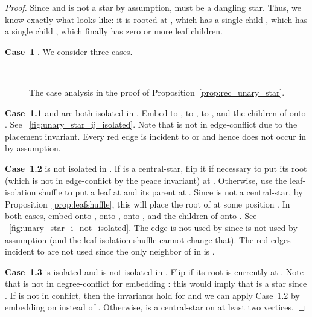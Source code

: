 \documentclass[11pt,a4paper,colorlinks=true,urlcolor=blue,citecolor=red]{article}
\theoremstyle{plain}
\newcommand{\case}[1]{\par\vspace{.5\baselineskip}\noindent\textbf{\sffamily Case~#1}}
\begin{document}
\begin{proof}
  Since  and  is not a star by assumption,  must be a
  dangling star. Thus, we know exactly what  looks like: it is rooted
  at , which has a single child , which has a single child ,
  which finally has zero or more leaf children.

  \case{1} . We consider three cases.

  \begin{figure}[b]
    \centering
    \hfil {}\hfil {}\\
    \hfil {}\hfil {}
    \caption{The case analysis in the proof of
      Proposition~\ref{prop:rec_unary_star}.}
    \label{fig:unary_star}
  \end{figure}

  \case{1.1}  and  are both isolated in . Embed  to , 
  to ,  to , and the children of  onto . See
  \figurename~\ref{fig:unary_star_ij_isolated}. Note that  is not in
  edge-conflict due to the placement invariant. Every red edge is
  incident to  or  and hence does not occur in  by assumption.

  \case{1.2}  is not isolated in . If  is a
  central-star, flip it if necessary to put its root (which is not in
  edge-conflict by the peace invariant) at . Otherwise, use
  the leaf-isolation shuffle to put a leaf at  and its parent at
  . Since  is not a central-star, by
  Proposition~\ref{prop:leafshuffle}, this will place the root of
   at some position . In both cases, embed  onto
  ,  onto ,  onto , and the children of  onto
  . See \figurename~\ref{fig:unary_star_i_not_isolated}. The
  edge  is not used by  since  is not used by
  assumption (and the leaf-isolation shuffle cannot change that). The
  red edges incident to  are not used since the only neighbor of
   in  is .

  \case{1.3}  is isolated and  is not isolated in . Flip
   if its root is currently at . Note that  is not
  in degree-conflict for embedding : this would imply that
   is a star since . If  is not in
  conflict, then the invariants hold for  and we can apply
  Case~1.2 by embedding  on  instead of . Otherwise,
   is a central-star on at least two vertices.


\end{proof}
\end{document}
